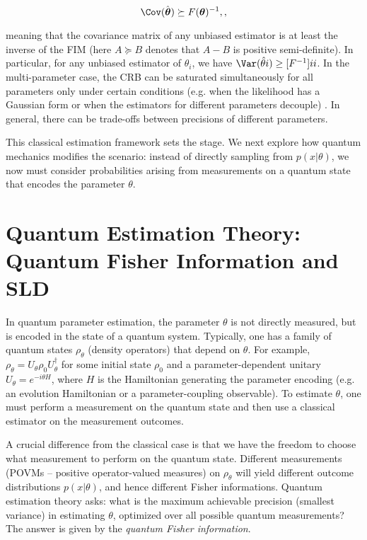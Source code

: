 \begin{equation}

\Cov(\hat{\vec{\theta}}) \succeq F(\vec{\theta})^{-1} ,,

\end{equation}

meaning that the covariance matrix of any unbiased estimator is at
least the inverse of the FIM (here $A \succeq B$ denotes that $A - B$
is positive semi-definite). In particular, for any unbiased estimator
of $\theta_i$, we have $\Var(\hat{\theta}i) \ge [F^{-1}]{ii}$. In the
multi-parameter case, the CRB can be saturated simultaneously for all
parameters only under certain conditions (e.g. when the likelihood has
a Gaussian form or when the estimators for different parameters
decouple) \cite{Kay1993}. In general, there can be trade-offs between
precisions of different parameters.



This classical estimation framework sets the stage. We next explore
how quantum mechanics modifies the scenario: instead of directly
sampling from $p(x|\theta)$, we now must consider probabilities
arising from measurements on a quantum state that encodes the
parameter $\theta$.



\section{Quantum Estimation Theory: Quantum Fisher Information and SLD}

\label{sec:quantum-estimation}



In quantum parameter estimation, the parameter $\theta$ is not
directly measured, but is encoded in the state of a quantum
system. Typically, one has a family of quantum states $\rho_\theta$
(density operators) that depend on $\theta$. For example, $\rho_\theta
= U_\theta \rho_0 U_\theta^\dagger$ for some initial state $\rho_0$
and a parameter-dependent unitary $U_\theta = e^{-i\theta H}$, where
$H$ is the Hamiltonian generating the parameter encoding (e.g. an
evolution Hamiltonian or a parameter-coupling observable). To estimate
$\theta$, one must perform a measurement on the quantum state and then
use a classical estimator on the measurement outcomes.



A crucial difference from the classical case is that we have the
freedom to choose what measurement to perform on the quantum
state. Different measurements (POVMs – positive operator-valued
measures) on $\rho_\theta$ will yield different outcome distributions
$p(x|\theta)$, and hence different Fisher informations. Quantum
estimation theory asks: what is the maximum achievable precision
(smallest variance) in estimating $\theta$, optimized over all
possible quantum measurements? The answer is given by the
\textit{quantum Fisher information}.



